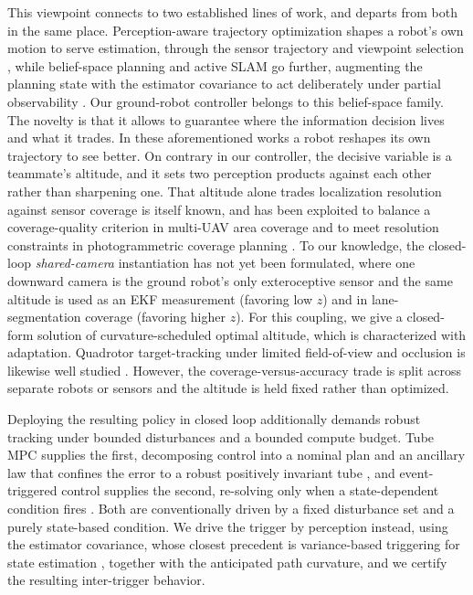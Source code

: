 \documentclass{ifacconf}
\begin{document}
This viewpoint connects to two established lines of work, and departs from both in the same place.
Perception-aware trajectory optimization shapes a robot's own motion to serve estimation, through the
sensor trajectory \citep{falanga2018pampc,spasojevic2020perception} and viewpoint selection
\citep{zhang2019fisher}, while belief-space planning and active SLAM go further, augmenting the planning
state with the estimator covariance to act deliberately under partial observability
\citep{platt2010belief,vandenberg2012motion,placed2023survey}.
Our ground-robot controller belongs to this belief-space family. The novelty is that it allows to guarantee
where the information decision lives and what it trades. In these aforementioned works a robot reshapes its
own trajectory to see better. On contrary in our controller, the decisive variable is a teammate's
altitude, and it sets two perception products against each other rather than sharpening one. That altitude
alone trades localization resolution against sensor coverage is itself known, and has been exploited to
balance a coverage-quality criterion in multi-UAV area coverage \citep{papatheodorou2017coverage} and to
meet resolution constraints in photogrammetric coverage planning \citep{difranco2016coverage}. To our
knowledge, the closed-loop \emph{shared-camera} instantiation has not yet been formulated, where one
downward camera is the ground robot's only exteroceptive sensor and the same altitude is used as an EKF
measurement (favoring low $z$) and in lane-segmentation coverage (favoring higher $z$). For this coupling,
we give a closed-form solution of curvature-scheduled optimal altitude, which is characterized with
adaptation. Quadrotor target-tracking under limited field-of-view and occlusion is likewise well studied
\citep{thomas2017autonomous,penin2018vision}. However, the coverage-versus-accuracy trade is split across
separate robots or sensors and the altitude is held fixed rather than optimized.

Deploying the resulting policy in closed loop additionally demands robust tracking
under bounded disturbances and a bounded compute budget. Tube MPC supplies the first, decomposing control
into a nominal plan and an ancillary law that confines the error to a robust positively invariant tube
\citep{mayne2005robust,mRPI}, and event-triggered
control supplies the second, re-solving only when a state-dependent condition fires
\citep{tabuada2007event,li2014event}. Both are conventionally driven
by a fixed disturbance set and a purely state-based condition. We drive the trigger by perception instead,
using the estimator covariance, whose closest precedent is variance-based triggering for state estimation
\citep{trimpe2014event}, together with the anticipated path curvature, and we certify the resulting
inter-trigger behavior.
\end{document}
